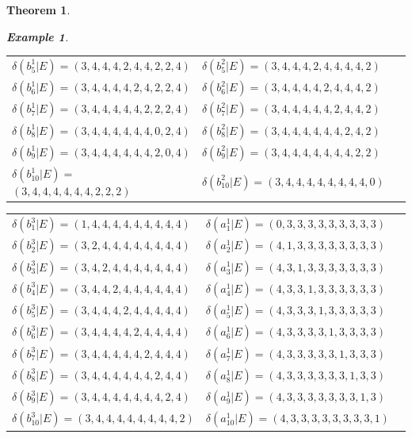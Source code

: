 \documentclass[]{interact}
\theoremstyle{plain}%
\newtheorem{theorem}{Theorem}[section]
\theoremstyle{definition}
\newtheorem{example}{Example}[section]
\theoremstyle{remark}
\begin{document}
\begin{theorem}
\begin{example}
\begin{table}[h!]
\begin{tabular}{|p{0.4\linewidth}|p{0.4\linewidth}|p{0.4\linewidth}|}
        $\delta(b^1_{5}|E)= (3,4,4,4,2,4,4,2,2,4)$ & $\delta(b^2 _5|E)=(3,4,4,4,2,4,4,4,4,2)$    \\
    
      $\delta(b^1_{6}|E)= (3,4,4,4,4,2,4,2,2,4)$ &  $\delta(b^2 _6|E)=(3,4,4,4,4,2,4,4,4,2)$   \\

      $\delta(b^1_{7}|E)= (3,4,4,4,4,4,2,2,2,4)$ &  $\delta(b^2 _7|E)=(3,4,4,4,4,4,2,4,4,2)$    \\
     
      
      $\delta(b^1_{8}|E)= (3,4,4,4,4,4,4,0,2,4)$&   $\delta(b^2 _8|E)=(3,4,4,4,4,4,4,2,4,2)$     \\
    
      
      $\delta(b^1_{9}|E)= (3,4,4,4,4,4,4,2,0,4)$ &  $\delta(b^2 _9|E)=(3,4,4,4,4,4,4,4,2,2)$ \\
   
      
      $\delta(b^1_{10}|E)= $$(3,4,4,4,4,4,4,2,2,2)$&   $\delta(b^2 _{10}|E)=(3,4,4,4,4,4,4,4,4,0)$      \\
      \hline
      
    \end{tabular}
    
    \end{table}
    \begin{table}[h!]
    \begin{tabular}
    {|p{0.4\linewidth}|p{0.4\linewidth}|p{0.4\linewidth}|}
    \hline
      $\delta(b^3 _1|E)=(1,4,4,4,4,4,4,4,4,4)$&         $\delta(a^1 _1|E)=(0,3,3,3,3,3,3,3,3,3)$\\
      $\delta(b^3 _2|E)=(3,2,4,4,4,4,4,4,4,4)$&$\delta(a^1 _2|E)= (4,1,3,3,3,3,3,3,3,3) $\\
      
        $\delta(b^3 _3|E)=(3,4,2,4,4,4,4,4,4,4)$&$\delta(a^1 _3|E)= (4,3,1,3,3,3,3,3,3,3)$\\
        $\delta(b^3 _4|E)=(3,4,4,2,4,4,4,4,4,4)$&$\delta(a^1 _4|E)= (4,3,3,1,3,3,3,3,3,3)$\\
        $\delta(b^3 _5|E)=(3,4,4,4,2,4,4,4,4,4)$&$\delta(a^1 _5|E)= (4,3,3,3,1,3,3,3,3,3)$\\
         $\delta(b^3 _6|E)=(3,4,4,4,4,2,4,4,4,4)$& $\delta(a^1 _6|E)= (4,3,3,3,3,1,3,3,3,3)$ \\
          $\delta(b^3 _{7}|E)=(3,4,4,4,4,4,2,4,4,4)$&$\delta(a^1 _7|E)= (4,3,3,3,3,3,1,3,3,3)$ \\
          $\delta(b^3_{8}|E)=(3,4,4,4,4,4,4,2,4,4)$ &$\delta(a^1 _8|E)= (4,3,3,3,3,3,3,1,3,3)$\\
           $\delta(b^3_{9}|E)=(3,4,4,4,4,4,4,4,2,4)$& $\delta(a^1 _9|E)= (4,3,3,3,3,3,3,3,1,3)$\\
           $\delta(b^3_{10}|E)=(3,4,4,4,4,4,4,4,4,2)$& $\delta(a^1 _{10}|E)= (4,3,3,3,3,3,3,3,3,1)$\\
           \hline
    \end{tabular}
    

\end{table}
\end{example}
\end{theorem}
\end{document}
